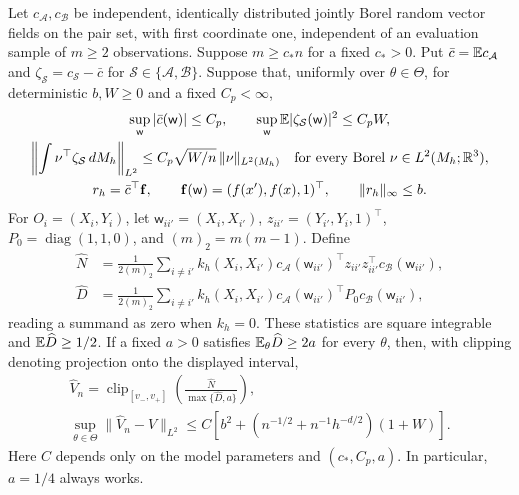\begin{proposition}\label{prop:pair-risk}
Let $c_{\mathcal A},c_{\mathcal B}$ be independent, identically
distributed jointly Borel random vector fields on the pair set,
with first coordinate one, independent of an evaluation sample of
$m\ge2$ observations. Suppose $m\ge c_*n$ for a fixed $c_*>0$.
Put $\bar c=\mathbb E c_{\mathcal A}$ and
$\zeta_{\mathcal S}=c_{\mathcal S}-\bar c$ for
$\mathcal S\in\{\mathcal A,\mathcal B\}$. Suppose that, uniformly over
$\theta\in\Theta$, for deterministic $b,W\ge0$ and a fixed $C_p<\infty$,
\begin{equation}\label{eq:pair-pilot-bounds}
\begin{gathered}
 \sup_{\mathsf w}|\bar c(\mathsf w)|\le C_p,\qquad
 \sup_{\mathsf w}\mathbb E|\zeta_{\mathcal S}(\mathsf w)|^2\le C_pW,\\
 \left\|\int\nu^\top\zeta_{\mathcal S}\,dM_h\right\|_{L^2}
 \le C_p\sqrt{W/n}\,\|\nu\|_{L^2(M_h)}
 \quad\text{for every Borel }\nu\in L^2(M_h;\mathbb R^3),\\
 r_h=\bar c^\top\mathbf f,\qquad
 \mathbf f(\mathsf w)=(f(x'),f(x),1)^\top,\qquad
 \|r_h\|_\infty\le b.
\end{gathered}
\end{equation}
For $O_i=(X_i,Y_i)$, let $\mathsf w_{ii'}=(X_i,X_{i'})$,
$z_{ii'}=(Y_{i'},Y_i,1)^\top$, $P_0=\operatorname{diag}(1,1,0)$,
and $(m)_2=m(m-1)$. Define
\begin{equation}\label{eq:pair-statistics}
\begin{aligned}
 \widehat N&=\frac1{2(m)_2}\sum_{i\ne i'}k_h(X_i,X_{i'})
 c_{\mathcal A}(\mathsf w_{ii'})^\top z_{ii'}z_{ii'}^\top
 c_{\mathcal B}(\mathsf w_{ii'}),\\
 \widehat D&=\frac1{2(m)_2}\sum_{i\ne i'}k_h(X_i,X_{i'})
 c_{\mathcal A}(\mathsf w_{ii'})^\top P_0c_{\mathcal B}(\mathsf w_{ii'}),
\end{aligned}
\end{equation}
reading a summand as zero when $k_h=0$. These statistics are square
integrable and $\mathbb E\widehat D\ge1/2$. If a fixed $a>0$ satisfies
$\mathbb E_\theta\widehat D\ge2a$ for every $\theta$, then, with clipping
denoting projection onto the displayed interval,
\begin{equation}\label{eq:pair-risk}
\begin{gathered}
 \widehat V_n=\operatorname{clip}_{[v_-,v_+]}
 \left(\frac{\widehat N}{\max\{\widehat D,a\}}\right),\\
 \sup_{\theta\in\Theta}\|\widehat V_n-V\|_{L^2}
 \le C\left[b^2+(n^{-1/2}+n^{-1}h^{-d/2})(1+W)\right].
\end{gathered}
\end{equation}
Here $C$ depends only on the model parameters and $(c_*,C_p,a)$.
In particular, $a=1/4$ always works.
\end{proposition}

